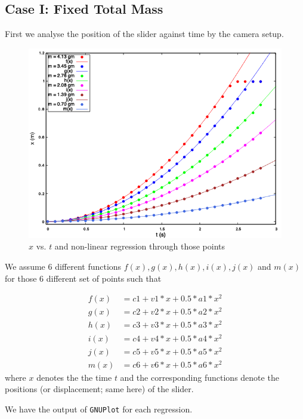\documentclass[11pt, a4paper, abstract=true]{scrartcl}
\begin{document}
\subsection{Case I: Fixed Total Mass}
First we analyse the position of the slider against time by the camera setup.
\begin{figure}[h]
    \centering
    \includegraphics[scale=0.65]{assets/xt_fixed_mass.png}
    \caption{\(x\) vs. \(t\) and non-linear regression through those points}
    \label{fig:fig1}
\end{figure}
We assume 6 different functions \(f(x), g(x), h(x), i(x), j(x)\) and \(m(x)\) for those 6 different set of points such that 
\begin{algorithm}
    \begin{align*}
        f(x) &= c1 + v1 * x + 0.5 * a1 * x^2 \\
        g(x) &= c2 + v2 * x + 0.5 * a2 * x^2 \\
        h(x) &= c3 + v3 * x + 0.5 * a3 * x^2 \\
        i(x) &= c4 + v4 * x + 0.5 * a4 * x^2 \\
        j(x) &= c5 + v5 * x + 0.5 * a5 * x^2 \\
        m(x) &= c6 + v6 * x + 0.5 * a6 * x^2
    \end{align*}
    where \(x\) denotes the the time \(t\) and the corresponding functions denote the positions (or displacement; same here) of the slider.
\end{algorithm}
We have the output of \texttt{GNUPlot} for each regression.

\newpage
\end{document}

